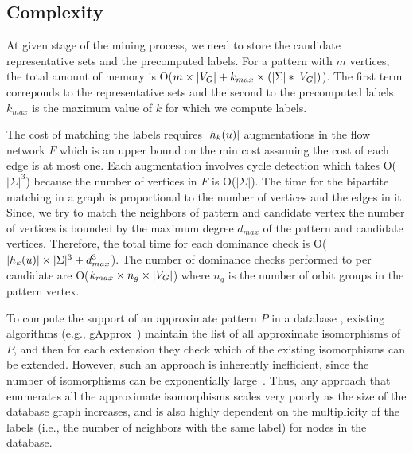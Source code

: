 \subsection{Complexity}
 At given stage of the mining process,
we need to store the candidate representative sets and the precomputed 
\khop labels. For a pattern with $m$ vertices, the total amount of memory
is O($m \times |V_G| + k_{max} \times ( |\Sigma| * |V_G|)$). The first term
correponds to the representative sets and the second to the precomputed
\khop labels. $k_{max}$ is the maximum value of $k$ for which we compute \khop
labels.

 The cost of matching the \khop labels
requires $|h_{k}(u)|$ augmentations in the flow network $F$ which is an
upper bound on the min cost assuming the cost of each edge is at most one. Each
augmentation involves cycle detection which takes O($|\Sigma|^3$) because the
number of vertices in $F$ is O($|\Sigma|$).  The time for the bipartite matching
in a graph is proportional to the number of vertices and the edges in it.
Since, we try to match the neighbors of pattern and candidate vertex the number
of vertices is bounded by the maximum degree $d_{max}$ of the pattern and
candidate vertices. Therefore, the total time for each dominance check is
O($|h_{k}(u)| \times |\Sigma|^3 + d_{max}^{3}$).  The number of dominance
checks performed to per candidate are O($k_{max} \times n_g \times |V_G|$) where
$n_g$ is the number of orbit groups in the pattern vertex. 

To compute the support of an approximate pattern $P$ in a database \db,
existing algorithms (e.g., gApprox~\cite{gapprox}) maintain the list of
all approximate isomorphisms of $P$, and then for each extension they
check which of the existing isomorphisms can be extended. However, such an
approach is inherently inefficient, since the number of isomorphisms can
be exponentially large~\cite{2012-kais}.  Thus, any approach that
enumerates all the approximate isomorphisms scales very poorly as the size
of the database graph increases, and is also highly dependent on the
multiplicity of the labels (i.e., the number of neighbors with the same
label) for nodes in the database.

